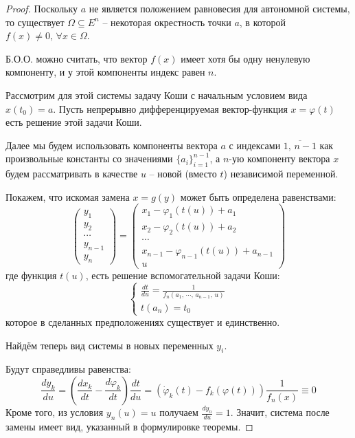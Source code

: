 \documentclass[a4paper,12pt]{article}
\renewcommand{\phi}{\ensuremath{\varphi}}
\theoremstyle{plain}
\theoremstyle{definition}
\theoremstyle{remark}
\begin{document}
\begin{proof}
	Поскольку $a$ не является положением равновесия для автономной системы, то существует $\Omega \subseteq E^n$ -- некоторая окрестность точки $a$, в которой $f(x) \neq 0,\, \forall x \in \Omega$.

	Б.О.О. можно считать, что вектор $f(x)$ имеет хотя бы одну ненулевую компоненту, и у этой компоненты индекс равен $n$.

	Рассмотрим для этой системы задачу Коши с начальным условием вида $x(t_0) = a$. Пусть непрерывно дифференцируемая вектор-функция $x = \phi(t)$ есть решение этой задачи Коши.

	Далее мы будем использовать компоненты вектора $a$ с индексами $\overline{1,\,n-1}$ как произвольные константы со значениями $\{a_i\}_{i = 1}^{n-1}$, а $n$-ую компоненту вектора $x$ будем рассматривать в качестве $u$ -- новой (вместо $t$) независимой переменной.

	Покажем, что искомая замена $x = g(y)$ может быть определена равенствами:
	\[\begin{pmatrix}
			y_1     \\
			y_2     \\
			\cdots  \\
			y_{n-1} \\
			y_n
		\end{pmatrix} = \begin{pmatrix}
			x_1 - \phi_1(t(u)) + a_1             \\
			x_2 - \phi_2(t(u)) + a_2             \\
			\cdots                               \\
			x_{n-1} - \phi_{n-1}(t(u)) + a_{n-1} \\
			u
		\end{pmatrix}\]
	где функция $t(u)$, есть решение вспомогательной задачи Коши:
	\[\begin{cases}
			\frac{dt}{du} = \frac{1}{f_n(a_1,\,\cdots,\,a_{n-1},\,u)} \\
			t(a_n) = t_0
		\end{cases}\]
	которое в сделанных предположениях существует и единственно.

	Найдём теперь вид системы в новых переменных $y_i$.

	Будут справедливы равенства:
	\[\frac{dy_k}{du} = \left(\frac{dx_k}{dt} - \frac{d\phi_k}{dt}\right)\frac{dt}{du} = \left(\dot{\phi}_k(t) - f_k(\phi(t))\right) \frac{1}{f_n(x)} \equiv 0\]
	Кроме того, из условия $y_n(u) = u$ получаем $\frac{dy_n}{du} = 1$. Значит, система после замены имеет вид, указанный в формулировке теоремы.


\end{proof}
\end{document}
